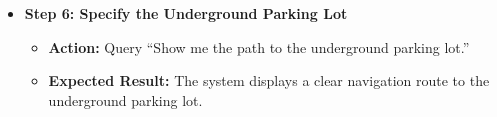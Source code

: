 \begin{itemize}
    \item \textbf{Step 6: Specify the Underground Parking Lot}
    \begin{itemize}
        \item \textbf{Action:} Query “Show me the path to the underground parking lot.”
        \item \textbf{Expected Result:} The system displays a clear navigation route to the underground parking lot.
    \end{itemize}
\end{itemize}
